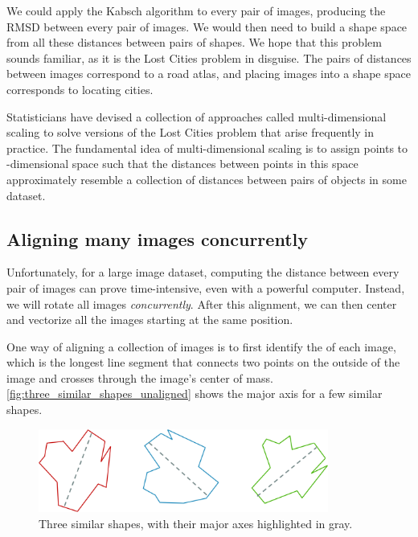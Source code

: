 We could apply the Kabsch algorithm to every pair of images, producing the RMSD between every pair of images. We would then need to build a shape space from all these distances between pairs of shapes. We hope that this problem sounds familiar, as it is the Lost Cities problem in disguise. The pairs of distances between images correspond to a road atlas, and placing images into a shape space corresponds to locating cities.

Statisticians have devised a collection of approaches called multi-dimensional scaling to solve versions of the Lost Cities problem that arise frequently in practice. The fundamental idea of multi-dimensional scaling is to assign points to -dimensional space such that the distances between points in this space approximately resemble a collection of distances between pairs of objects in some dataset.\\

\begin{qbox}\end{qbox}

\vspace{-\baselineskip}

\FloatBarrier
{}
\subsection{Aligning many images concurrently}

Unfortunately, for a large image dataset, computing the distance between every pair of images can prove time-intensive, even with a powerful computer. Instead, we will rotate all images \textit{concurrently}. After this alignment, we can then center and vectorize all the images starting at the same position.

One way of aligning a collection of images is to first identify the  of each image, which is the longest line segment that connects two points on the outside of the image and crosses through the image's center of mass. \autoref{fig:three_similar_shapes_unaligned} shows the major axis for a few similar shapes.\\

\begin{figure}[h]
\centering
\mySfFamily
\includegraphics[width = 0.85\textwidth]{../images_CMYK/three_similar_shapes_unaligned}
\caption{Three similar shapes, with their major axes highlighted in gray.}
\label{fig:three_similar_shapes_unaligned}
\end{figure}

